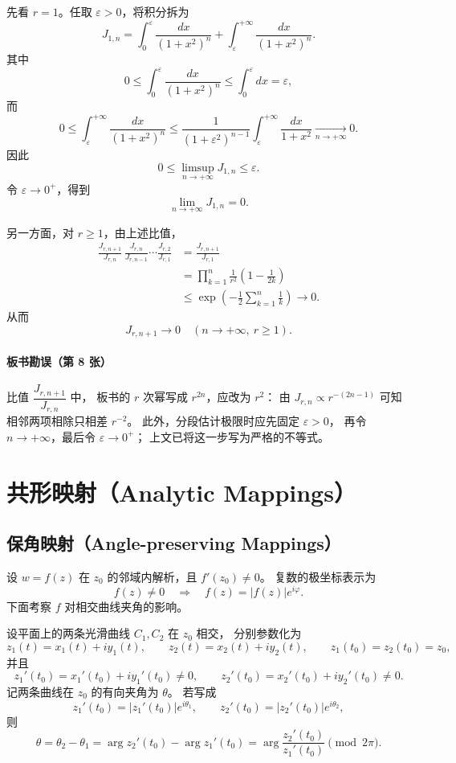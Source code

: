 先看 $r=1$。任取 $\varepsilon>0$，将积分拆为
\[
  J_{1,n}
  =\int_0^\varepsilon\frac{dx}{(1+x^2)^n}
   +\int_\varepsilon^{+\infty}\frac{dx}{(1+x^2)^n}.
\]
其中
\[
  0\le \int_0^\varepsilon\frac{dx}{(1+x^2)^n}
  \le\int_0^\varepsilon dx=\varepsilon,
\]
而
\[
  0\le\int_\varepsilon^{+\infty}\frac{dx}{(1+x^2)^n}
  \le\frac{1}{(1+\varepsilon^2)^{n-1}}
     \int_\varepsilon^{+\infty}\frac{dx}{1+x^2}
  \xrightarrow[n\to+\infty]{}0.
\]
因此
\[
  0\le\limsup_{n\to+\infty}J_{1,n}\le\varepsilon.
\]
令 $\varepsilon\to0^+$，得到
\[
  \boxed{\lim_{n\to+\infty}J_{1,n}=0}.
\]

另一方面，对 $r\ge1$，由上述比值，
\begin{align*}
  \frac{J_{r,n+1}}{J_{r,n}}\,
  \frac{J_{r,n}}{J_{r,n-1}}\cdots
  \frac{J_{r,2}}{J_{r,1}}
  &=\frac{J_{r,n+1}}{J_{r,1}}\\
  &=\prod_{k=1}^{n}\frac{1}{r^2}
       \left(1-\frac{1}{2k}\right)\\
  &\le \exp\left(-\frac12\sum_{k=1}^{n}\frac1k\right)
    \longrightarrow0.
\end{align*}
从而
\[
  \boxed{J_{r,n+1}\longrightarrow0\quad(n\to+\infty,\ r\ge1).}
\]

\paragraph{板书勘误（第 8 张）}
比值 $\dfrac{J_{r,n+1}}{J_{r,n}}$ 中，
板书的 $r$ 次幂写成 $r^{2n}$，应改为 $r^2$：
由 $J_{r,n}\propto r^{-(2n-1)}$ 可知相邻两项相除只相差 $r^{-2}$。
此外，分段估计极限时应先固定 $\varepsilon>0$，
再令 $n\to+\infty$，最后令 $\varepsilon\to0^+$；
上文已将这一步写为严格的不等式。


\setcounter{section}{5}
\section{共形映射（Analytic Mappings）}
\subsection*{保角映射（Angle-preserving Mappings）}

设 $w=f(z)$ 在 $z_0$ 的邻域内解析，且 $f'(z_0)\ne0$。
复数的极坐标表示为
\[
  f(z)\ne0\quad\Longrightarrow\quad
  f(z)=|f(z)|e^{i\varphi}.
\]
下面考察 $f$ 对相交曲线夹角的影响。

设平面上的两条光滑曲线 $C_1,C_2$ 在 $z_0$ 相交，
分别参数化为
\[
  z_1(t)=x_1(t)+iy_1(t),\qquad
  z_2(t)=x_2(t)+iy_2(t),
  \qquad z_1(t_0)=z_2(t_0)=z_0,
\]
并且
\[
  z_1'(t_0)=x_1'(t_0)+iy_1'(t_0)\ne0,\qquad
  z_2'(t_0)=x_2'(t_0)+iy_2'(t_0)\ne0.
\]
记两条曲线在 $z_0$ 的有向夹角为 $\theta$。
若写成
\[
  z_1'(t_0)=|z_1'(t_0)|e^{i\theta_1},\qquad
  z_2'(t_0)=|z_2'(t_0)|e^{i\theta_2},
\]
则
\[
  \theta=\theta_2-\theta_1
  =\arg z_2'(t_0)-\arg z_1'(t_0)
  =\arg\frac{z_2'(t_0)}{z_1'(t_0)}
  \pmod{2\pi}.
\]

